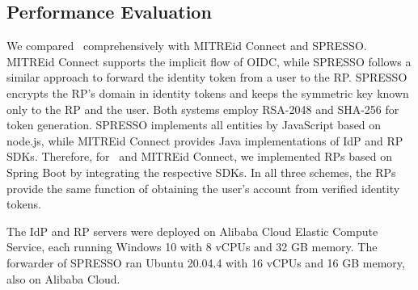 \subsection{Performance Evaluation}
\label{sec:evaluation}


 We compared \usso~comprehensively with MITREid Connect and SPRESSO.
MITREid Connect supports the implicit flow of OIDC,
 while SPRESSO follows a similar approach to forward the identity token from a user to the RP.
 SPRESSO encrypts the RP's domain in identity tokens and keeps the symmetric key known only to the RP and the user. Both systems employ RSA-2048 and SHA-256 for token generation.
SPRESSO implements all entities by JavaScript based on node.js, while MITREid Connect provides Java implementations of IdP and RP SDKs.
Therefore, for \usso~and MITREid Connect, we implemented RPs based on Spring Boot by integrating the respective SDKs. In all three schemes, the RPs provide the same function of obtaining the user's account from verified identity tokens.

The IdP and RP servers were deployed on Alibaba Cloud Elastic Compute Service, each running Windows 10 with 8 vCPUs and 32 GB memory. The forwarder of SPRESSO ran Ubuntu 20.04.4 with 16 vCPUs and 16 GB memory, also on Alibaba Cloud.

